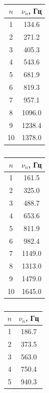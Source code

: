 \documentclass[a4paper]{article}
\begin{document}
\begin{itemize}
\begin{table}[]
\begin{minipage}{0.19 \linewidth}
\centering
\begin{tabular}{|c|c|}
\hline
$n$  & $\nu_n$, Гц \\ \hline
1  & 134.6     \\ \hline
2  & 271.2     \\ \hline
3  & 405.3     \\ \hline
4  & 543.6     \\ \hline
5  & 681.9     \\ \hline
6  & 819.3     \\ \hline
7  & 957.1     \\ \hline
8  & 1096.0    \\ \hline
9  & 1238.4    \\ \hline
10 & 1378.0    \\ \hline
\end{tabular}
\caption{}
\end{minipage}
\begin{minipage}{0.19 \linewidth}
\centering
\begin{tabular}{|c|c|}
\hline
$n$ & $\nu_n$, Гц \\ \hline
1   & 161.5     \\ \hline
2   & 325.0       \\ \hline
3   & 488.7     \\ \hline
4   & 653.6     \\ \hline
5   & 811.9     \\ \hline
6   & 982.4     \\ \hline
7   & 1149.0      \\ \hline
8   & 1313.0      \\ \hline
9   & 1479.0      \\ \hline
10  & 1645.0      \\ \hline
\end{tabular}
\caption{}
\end{minipage}
\begin{minipage}{0.19 \linewidth}
\centering
\begin{tabular}{|c|c|}
\hline
$n$ & $\nu_n$, Гц \\ \hline
1   & 186.7     \\ \hline
2   & 373.5     \\ \hline
3   & 563.0       \\ \hline
4   & 750.4     \\ \hline
5   & 940.3     \\ \hline

\end{tabular}
\end{minipage}
\end{table}
\end{itemize}
\end{document}
